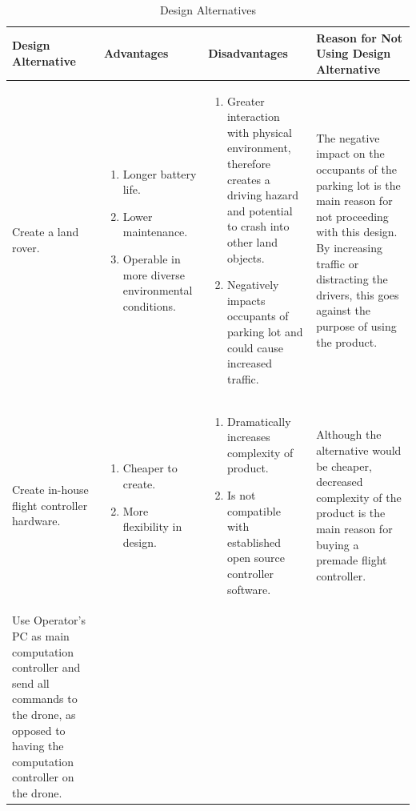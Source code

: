 \documentclass[12pt, titlepage]{article}
\begin{document}
\begin{landscape}
\begin{table}[!h]
\begin{center}
\caption {Design Alternatives}
\label{tab:designAlternatives}
\begin{tabular}{ | m{4.5cm} | m{4.6cm} | m{6.5cm} | m{6.7cm} | } 
\hline
Design Alternative & Advantages & Disadvantages & Reason for Not Using Design Alternative \\
\hline
Create a land rover. & 
    \begin{enumerate}
        \item Longer battery life.
        \item Lower maintenance.
        \item Operable in more diverse environmental conditions.
    \end{enumerate} &
    \begin{enumerate}
        \item Greater interaction with physical environment, therefore creates a driving hazard and potential to crash into other land objects.
        \item Negatively impacts occupants of parking lot and could cause increased traffic.
    \end{enumerate} &
    The negative impact on the occupants of the parking lot is the main reason for not proceeding with this design. By increasing traffic or distracting the drivers, this goes against the purpose of using the product. \\
\hline
Create in-house flight controller hardware. & 
    \begin{enumerate}
        \item Cheaper to create.
        \item More flexibility in design.
    \end{enumerate} &
    \begin{enumerate}
        \item Dramatically increases complexity of product.
        \item Is not compatible with established open source controller software.
    \end{enumerate} &
    Although the alternative would be cheaper, decreased complexity of the product is the main reason for buying a premade flight controller. \\
\hline
Use Operator's PC as main computation controller and send all commands to the drone, as opposed to having the computation controller on the drone. & 

\end{tabular}
\end{center}
\end{table}
\end{landscape}
\end{document}
